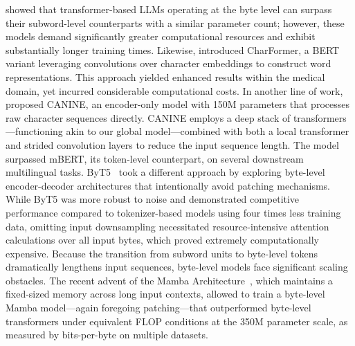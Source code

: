 \cite{Choe2019BridgingTG} showed that transformer-based LLMs operating at the byte level can surpass their subword-level counterparts with a similar parameter count; however, these models demand significantly greater computational resources and exhibit substantially longer training times. Likewise, \cite{el2020characterbert} introduced CharFormer, a BERT variant leveraging convolutions over character embeddings to construct word representations. This approach yielded enhanced results within the medical domain, yet incurred considerable computational costs. In another line of work, \cite{clark2022canine} proposed CANINE, an encoder-only model with 150M parameters that processes raw character sequences directly. CANINE employs a deep stack of transformers—functioning akin to our global model—combined with both a local transformer and strided convolution layers to reduce the input sequence length. The model surpassed mBERT, its token-level counterpart, on several downstream multilingual tasks. ByT5~\citep{xue2022byt5} took a different approach by exploring byte-level encoder-decoder architectures that intentionally avoid patching mechanisms. While ByT5 was more robust to noise and demonstrated competitive performance compared to tokenizer-based models using four times less training data, omitting input downsampling necessitated resource-intensive attention calculations over all input bytes, which proved extremely computationally expensive. Because the transition from subword units to byte-level tokens dramatically lengthens input sequences, byte-level models face significant scaling obstacles. The recent advent of the Mamba Architecture~\citep{gu2023mamba}, which maintains a fixed-sized memory across long input contexts, allowed \cite{wang2024mambabyte} to train a byte-level Mamba model—again foregoing patching—that outperformed byte-level transformers under equivalent FLOP conditions at the 350M parameter scale, as measured by bits-per-byte on multiple datasets.

